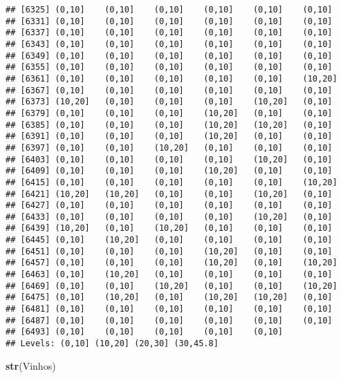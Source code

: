 \documentclass[]{article}
\newenvironment{Shaded}{\begin{snugshade}}{\end{snugshade}}
\newcommand{\KeywordTok}[1]{\textcolor[rgb]{0.13,0.29,0.53}{\textbf{#1}}}
\newcommand{\NormalTok}[1]{#1}
\begin{document}
\begin{verbatim}
## [6325] (0,10]    (0,10]    (0,10]    (0,10]    (0,10]    (0,10]   
## [6331] (0,10]    (0,10]    (0,10]    (0,10]    (0,10]    (0,10]   
## [6337] (0,10]    (0,10]    (0,10]    (0,10]    (0,10]    (0,10]   
## [6343] (0,10]    (0,10]    (0,10]    (0,10]    (0,10]    (0,10]   
## [6349] (0,10]    (0,10]    (0,10]    (0,10]    (0,10]    (0,10]   
## [6355] (0,10]    (0,10]    (0,10]    (0,10]    (0,10]    (0,10]   
## [6361] (0,10]    (0,10]    (0,10]    (0,10]    (0,10]    (10,20]  
## [6367] (0,10]    (0,10]    (0,10]    (0,10]    (0,10]    (0,10]   
## [6373] (10,20]   (0,10]    (0,10]    (0,10]    (10,20]   (0,10]   
## [6379] (0,10]    (0,10]    (0,10]    (10,20]   (0,10]    (0,10]   
## [6385] (0,10]    (0,10]    (0,10]    (10,20]   (10,20]   (0,10]   
## [6391] (0,10]    (0,10]    (0,10]    (10,20]   (0,10]    (0,10]   
## [6397] (0,10]    (0,10]    (10,20]   (0,10]    (0,10]    (0,10]   
## [6403] (0,10]    (0,10]    (0,10]    (0,10]    (10,20]   (0,10]   
## [6409] (0,10]    (0,10]    (0,10]    (10,20]   (0,10]    (0,10]   
## [6415] (0,10]    (0,10]    (0,10]    (0,10]    (0,10]    (10,20]  
## [6421] (10,20]   (10,20]   (0,10]    (0,10]    (10,20]   (0,10]   
## [6427] (0,10]    (0,10]    (0,10]    (0,10]    (0,10]    (0,10]   
## [6433] (0,10]    (0,10]    (0,10]    (0,10]    (10,20]   (0,10]   
## [6439] (10,20]   (0,10]    (10,20]   (0,10]    (0,10]    (0,10]   
## [6445] (0,10]    (10,20]   (0,10]    (0,10]    (0,10]    (0,10]   
## [6451] (0,10]    (0,10]    (0,10]    (10,20]   (0,10]    (0,10]   
## [6457] (0,10]    (0,10]    (0,10]    (10,20]   (0,10]    (10,20]  
## [6463] (0,10]    (10,20]   (0,10]    (0,10]    (0,10]    (0,10]   
## [6469] (0,10]    (0,10]    (10,20]   (0,10]    (0,10]    (10,20]  
## [6475] (0,10]    (10,20]   (0,10]    (10,20]   (10,20]   (0,10]   
## [6481] (0,10]    (0,10]    (0,10]    (0,10]    (0,10]    (0,10]   
## [6487] (0,10]    (0,10]    (0,10]    (0,10]    (0,10]    (0,10]   
## [6493] (0,10]    (0,10]    (0,10]    (0,10]    (0,10]   
## Levels: (0,10] (10,20] (20,30] (30,45.8]
\end{verbatim}

\begin{Shaded}
\begin{Highlighting}[]
\KeywordTok{str}\NormalTok{(Vinhos)}
\end{Highlighting}
\end{Shaded}
\end{document}
